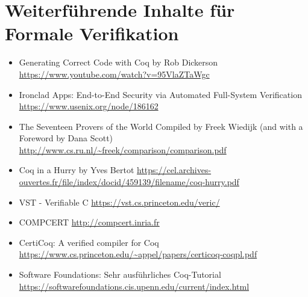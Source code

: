 \section{Weiterführende Inhalte für Formale Verifikation}
\label{a:somelabel}

\begin{itemize}
	\item Generating Correct Code with Coq by Rob Dickerson \url{https://www.youtube.com/watch?v=95VlaZTaWgc}
	\item Ironclad Apps: End-to-End Security via Automated Full-System Verification \url{https://www.usenix.org/node/186162}
	\item The Seventeen Provers of the World Compiled by Freek Wiedijk
	(and with a Foreword by Dana Scott)
	\url{http://www.cs.ru.nl/~freek/comparison/comparison.pdf}
	\item Coq in a Hurry by Yves Bertot \url{https://cel.archives-ouvertes.fr/file/index/docid/459139/filename/coq-hurry.pdf}
	\item VST - Verifiable C \url{https://vst.cs.princeton.edu/veric/}
	\item COMPCERT \url{http://compcert.inria.fr}
	\item CertiCoq: A verified compiler for Coq
	\url{https://www.cs.princeton.edu/~appel/papers/certicoq-coqpl.pdf}
	\item Software Foundations: Sehr ausführliches Coq-Tutorial \url{https://softwarefoundations.cis.upenn.edu/current/index.html}
\end{itemize} 


